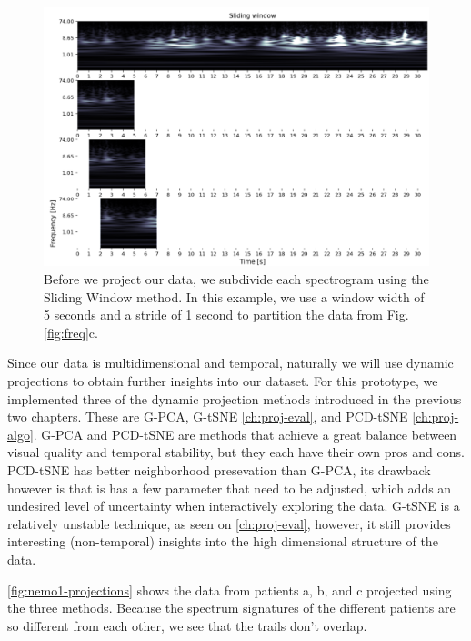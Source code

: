 \begin{figure}[ht]
\centering
\includegraphics[width=\linewidth]{figures/nemo/sliding.png}
\caption{Before we project our data, we subdivide each spectrogram using the Sliding Window method. In this example, we use a window width of 5 seconds and a stride of 1 second to partition the data from Fig. \ref{fig:freq}c.}
\label{fig:sliding}
\end{figure}

Since our data is multidimensional and temporal, naturally we will use dynamic projections to obtain further insights into our dataset.
For this prototype, we implemented three of the dynamic projection methods introduced in the previous two chapters. These are G-PCA, G-tSNE \cref{ch:proj-eval}, and PCD-tSNE \cref{ch:proj-algo}. 
G-PCA and PCD-tSNE are methods that achieve a great balance between visual quality and temporal stability, but they each have their own pros and cons. PCD-tSNE has better neighborhood presevation than G-PCA, its drawback however is that is has a few parameter that need to be adjusted, which adds an undesired level of uncertainty when interactively exploring the data.
G-tSNE is a relatively unstable technique, as seen on \cref{ch:proj-eval}, however, it still provides interesting (non-temporal) insights into the high dimensional structure of the data.

\cref{fig:nemo1-projections} shows the data from patients a, b, and c projected using the three methods. Because the spectrum signatures of the different patients are so different from each other, we see that the trails don't overlap. 


